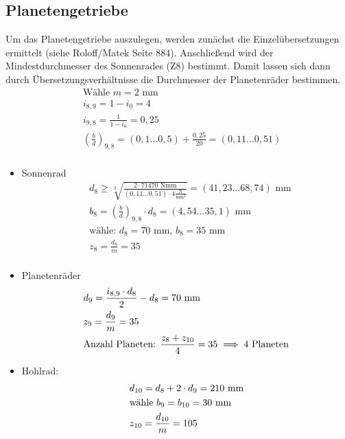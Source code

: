 \subsection{Planetengetriebe}
Um das Planetengetriebe auszulegen, werden zunächst die Einzelübersetzungen ermittelt (siehe Roloff/Matek Seite 884). Anschließend wird der Mindestdurchmesser des Sonnenrades (Z8) bestimmt. Damit lassen sich dann durch Übersetzungsverhältnisse die Durchmesser der Planetenräder bestimmen.
\begin{align*}
	&\text{Wähle } m=2  \text{ mm} \\
	&i_{8,9} = 1 - i_0 = 4 \\
	&i_{9,8} = \frac{1}{1-i_0}  = 0,25 \\
	& \left(\frac{b}{d} \right) _{9,8} = (0,1...0,5) + \frac{0,25}{20}  =  (0,11...0,51) \\
\end{align*}
\begin{itemize}
\item Sonnenrad
\begin{align*}
	&d_8 \ge \sqrt[3]{\frac{2 \cdot 71470 \text{ Nmm}}{(0,11...0,51) \cdot  4 \frac{\text{N}}{\text{mm}^2}}}= (41,23...68,74) \text{ mm}\\
	&b_8= \left(\frac{b}{d} \right) _{9,8}  \cdot d_8 = (4,54...35,1) \text{ mm}  \\
	&\text{wähle: } d_8 = 70 \text{ mm, } b_8 = 35 \text{ mm}  \\
	&z_8 = \frac{d_8}{m} =35 \\
\end{align*}
\item Planetenräder 
\begin{align*}
	&d_9 = \frac{i_{8,9} \cdot d_8}{2 } - d_8 = 70 \text{ mm}  \\
	&z_9 = \frac{d_9}{m} = 35 \\
	&\text{Anzahl Planeten: } \frac{z_{8} + z_{10}}{4} = 35 \implies 4 \text{ Planeten} \\
\end{align*}	
\item Hohlrad:
\begin{align*}
	&d_{10} = d_8 + 2\cdot d_9 = 210 \text{ mm}  \\
	&\text{wähle } b_9 = b_{10} = 30 \text{ mm}  \\
	&z_{10}  = \frac{d_{10}}{m} = 105 \\
\end{align*}	
\end{itemize}
